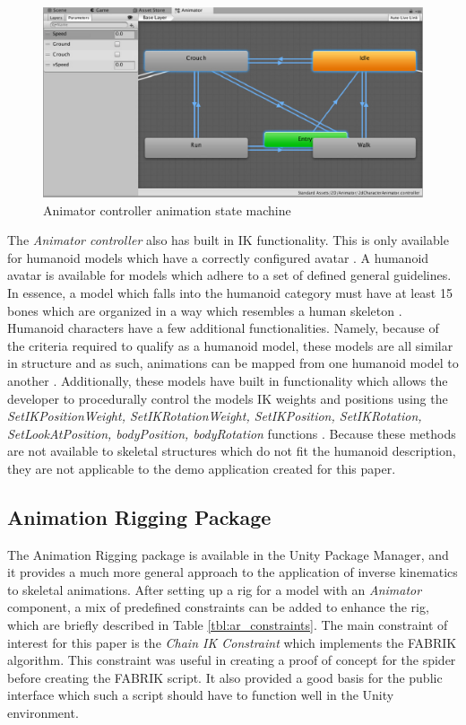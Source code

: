 \begin{figure}
    \centering
    \includegraphics[width=\textwidth]{grafika/animator_controller.eps}
    \caption{Animator controller animation state machine \cite{unity_animator}}
    \label{fig:anim_state}
\end{figure}

The \textit{Animator controller} also has built in IK functionality. This is only
available for humanoid models which have a correctly configured avatar
\cite{unity_ik}. A humanoid avatar is available for models which adhere to a set
of defined general guidelines. In essence, a model which falls into the humanoid
category must have at least 15 bones which are organized in a way which
resembles a human skeleton \cite{unity_humanoid_import}. Humanoid characters
have a few additional functionalities. Namely, because of the criteria required
to qualify as a humanoid model, these models are all similar in structure and as
such, animations can be mapped from one humanoid model to another
\cite{unity_humanoid_avatars}. Additionally, these models have built in
functionality which allows the developer to procedurally control the models IK
weights and positions using the \textit{SetIKPositionWeight,
SetIKRotationWeight, SetIKPosition, SetIKRotation, SetLookAtPosition,
bodyPosition, bodyRotation} functions \cite{unity_ik, unity_humanoid_avatars}.
Because these methods are not available to skeletal structures which do not fit
the humanoid description, they are not applicable to the demo application
created for this paper.

\subsection{Animation Rigging Package}

The Animation Rigging package is available in the Unity Package Manager, and it
provides a much more general approach to the application of inverse kinematics
to skeletal animations. After setting up a rig for a model with an
\textit{Animator} component, a mix of predefined constraints can be added to
enhance the rig, which are briefly described in Table \ref{tbl:ar_constraints}.
The main constraint of interest for this paper is the \textit{Chain IK
Constraint} which implements the FABRIK algorithm. This constraint was useful in
creating a proof of concept for the spider before creating the FABRIK script. It
also provided a good basis for the public interface which such a script should
have to function well in the Unity environment.

